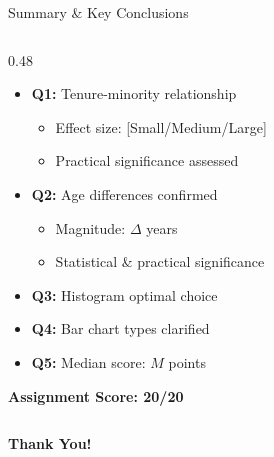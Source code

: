 \documentclass[aspectratio=169]{beamer}
\begin{document}
\begin{frame}{Summary \& Key Conclusions}
\begin{columns}[T]
\begin{column}{0.48\textwidth}
            \begin{itemize}
                \item \textbf{Q1:} Tenure-minority relationship
                    \begin{itemize}
                        \item Effect size: [Small/Medium/Large]
                        \item Practical significance assessed
                    \end{itemize}

                \vspace{0.2cm}

                \item \textbf{Q2:} Age differences confirmed
                    \begin{itemize}
                        \item Magnitude: $\Delta$ years
                        \item Statistical \& practical significance
                    \end{itemize}

                \vspace{0.2cm}

                \item \textbf{Q3:} Histogram optimal choice

                \vspace{0.2cm}

                \item \textbf{Q4:} Bar chart types clarified

                \vspace{0.2cm}

                \item \textbf{Q5:} Median score: $M$ points
            \end{itemize}

            \vspace{0.3cm}

            \textbf{Assignment Score: 20/20}
        \end{column}
    \end{columns}

    \vspace{0.5cm}

    \begin{center}
        \Large{\textbf{Thank You!}}
    \end{center}
\end{frame}
\end{document}

